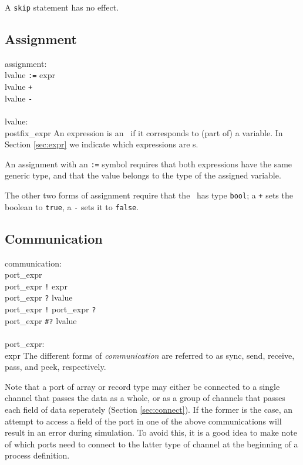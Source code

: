 A {\tt{}skip} statement has no effect.

\subsection{Assignment}\label{sec:assignment}

\grammarstart
assignment: \\
       \>lvalue {\tt{}:=} expr \\
\orbox \>lvalue {\tt{}+} \\
\orbox \>lvalue {\tt{}-} \\
 \\
lvalue: \\
      \>postfix\_expr
\grammarend
An expression is an \lvalue\ if it corresponds to (part of) a variable.
In Section \ref{sec:expr} we indicate which expressions are \lvalue s.

An assignment with an {\tt{}:=} symbol requires that both expressions
have the same generic type, and that the value belongs to the type of
the assigned variable.

The other two forms of assignment require that the \lvalue\ has type
{\tt{}bool}; a {\tt{}+} sets the boolean to {\tt{}true}, a {\tt{}-} sets it
to {\tt{}false}.



\subsection{Communication}\label{sec:communication}

\grammarstart
communication: \\
       \>port\_expr \\
\orbox \>port\_expr {\tt{}!} expr \\
\orbox \>port\_expr {\tt{}?} lvalue \\
\orbox \>port\_expr {\tt{}!} port\_expr {\tt{}?} \\
\orbox \>port\_expr {\tt{}\#?} lvalue \\
 \\
port\_expr: \\
      \>expr
\grammarend
The different forms of {\it{}communication} are referred to as sync, send,
receive, pass, and peek, respectively.

Note that a port of array or record type may either be connected to a single
channel that passes the data as a whole, or as a group of channels that passes
each field of data seperately (Section \ref{sec:connect}).  If the former is the
case, an attempt to access
a field of the port in one of the above communications will result in an error
during simulation.  To avoid this, it is a good idea to make note of which ports
need to connect to the latter type of channel at the beginning of a process definition.

